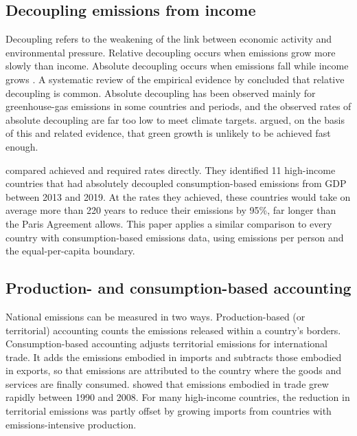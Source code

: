 \subsection{Decoupling emissions from income}

Decoupling refers to the weakening of the link between economic activity and environmental pressure. Relative decoupling occurs when emissions grow more slowly than income. Absolute decoupling occurs when emissions fall while income grows \citep{wiedenhofer2020}. A systematic review of the empirical evidence by \citet{haberl2020} concluded that relative decoupling is common. Absolute decoupling has been observed mainly for greenhouse-gas emissions in some countries and periods, and the observed rates of absolute decoupling are far too low to meet climate targets. \citet{hickel2020green} argued, on the basis of this and related evidence, that green growth is unlikely to be achieved fast enough.

\citet{vogel2023} compared achieved and required rates directly. They identified 11 high-income countries that had absolutely decoupled consumption-based \COtwo{} emissions from GDP between 2013 and 2019. At the rates they achieved, these countries would take on average more than 220 years to reduce their emissions by 95\%, far longer than the Paris Agreement allows. This paper applies a similar comparison to every country with consumption-based emissions data, using emissions per person and the equal-per-capita boundary.

\subsection{Production- and consumption-based accounting}

National emissions can be measured in two ways. Production-based (or territorial) accounting counts the emissions released within a country's borders. Consumption-based accounting adjusts territorial emissions for international trade. It adds the emissions embodied in imports and subtracts those embodied in exports, so that emissions are attributed to the country where the goods and services are finally consumed. \citet{peters2011} showed that emissions embodied in trade grew rapidly between 1990 and 2008. For many high-income countries, the reduction in territorial emissions was partly offset by growing imports from countries with emissions-intensive production.

